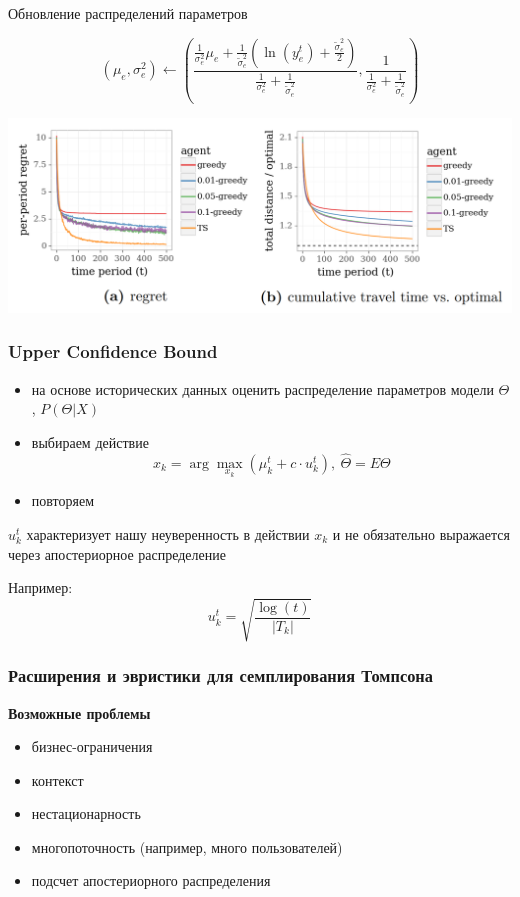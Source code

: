\documentclass[fullscreen=true, bookmarks=true, hyperref={pdfencoding=unicode}]{beamer}
\begin{document}
\begin{frame}
  Обновление распределений параметров

  $$ (\mu_e, \sigma_e^2) \leftarrow
  \left(
  \frac{\frac{1}{\sigma_e^2}\mu_e + \frac{1}{\tilde\sigma_e^2} \left(\ln(y^t_{e})+\frac{\tilde\sigma_e^2}{2} \right) }{\frac{1}{\sigma_e^2} + \frac{1}{\tilde\sigma_e^2}},
  \frac{1}{\frac{1}{\sigma_e^2} + \frac{1}{\tilde\sigma_e^2}}
  \right)$$
\end{frame}


\begin{frame}
  \begin{center}
    \includegraphics[keepaspectratio,
                     width=.9\paperwidth]{shortest_path_problem.png}
  \end{center}
\end{frame}


\begin{frame}
  \frametitle{Upper Confidence Bound}

  \begin{itemize}
    \item на основе исторических данных оценить распределение параметров модели $\Theta$, $P(\Theta|X)$
    \item выбираем действие $$ x_k = \arg\max_{x_k} (\mu_k^t + c \cdot u_k^t), \ \hat \Theta = E \Theta$$
    \item повторяем
  \end{itemize}

   $u_k^t$ характеризует нашу неуверенность в действии $x_k$ и не обязательно выражается через апостериорное распределение

  Например: $$ u_k^t = \sqrt{\frac{\log(t)}{|T_k|}}$$
\end{frame}


\begin{frame}
  \frametitle{Расширения и эвристики для семплирования Томпсона}

  {\bf Возможные проблемы}

  \begin{itemize}
    \item бизнес-ограничения
    \item контекст
    \item нестационарность
    \item многопоточность (например, много пользователей)
    \item подсчет апостериорного распределения
  \end{itemize}

\end{frame}
\end{document}
